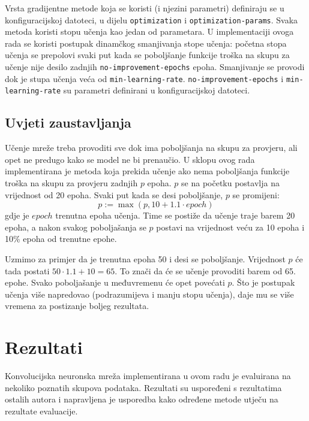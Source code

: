 \documentclass[times, utf8, diplomski, numeric]{fer}
\begin{document}
Vrsta gradijentne metode koja se koristi (i njezini parametri) definiraju se u konfiguracijskoj datoteci, u dijelu \texttt{optimization} i \texttt{optimization-params}. Svaka metoda koristi stopu učenja kao jedan od parametara. U implementaciji ovoga rada se koristi postupak dinamčkog smanjivanja stope učenja: početna stopa učenja se prepolovi svaki put kada se poboljšanje funkcije troška na skupu za učenje  nije desilo zadnjih \texttt{no-improvement-epochs} epoha. Smanjivanje se provodi dok je stupa učenja veća od \texttt{min-learning-rate}. \texttt{no-improvement-epochs} i \texttt{min-learning-rate} su parametri definirani u konfiguracijskoj datoteci.

\section{Uvjeti zaustavljanja}
Učenje mreže treba provoditi sve dok ima poboljšanja na skupu za provjeru, ali opet ne predugo kako se model ne bi prenaučio. U sklopu ovog rada implementirana je metoda koja prekida učenje ako nema poboljšanja funkcije troška na skupu za provjeru  zadnjih $p$ epoha. $p$ se na početku postavlja na vrijednost od 20 epoha. Svaki put kada se desi poboljšanje, $p$ se promijeni:
\begin{equation}
  p := \max \left( p, 10 + 1.1 \cdot epoch \right)
\end{equation}
gdje je $epoch$ trenutna epoha učenja. Time se postiže da učenje traje barem 20 epoha, a nakon svakog poboljašanja se $p$ postavi na vrijednost veću za 10 epoha i 10\% epoha od trenutne epohe.

Uzmimo za primjer da je trenutna epoha 50 i desi se poboljšanje. Vrijednost $p$ će tada postati $50 \cdot 1.1 + 10 = 65$. To znači da će se učenje provoditi barem od 65. epohe. Svako poboljašanje u međuvremenu će opet povećati $p$. Što je postupak učenja više napredovao (podrazumijeva i manju stopu učenja), daje mu se više vremena za postizanje boljeg rezultata.


\chapter{Rezultati}

Konvolucijska neuronska mreža implementirana u ovom radu je evaluirana na nekoliko poznatih skupova podataka. Rezultati su uspoređeni s rezultatima ostalih autora i napravljena je usporedba kako određene metode utječu na rezultate evaluacije.
\end{document}
